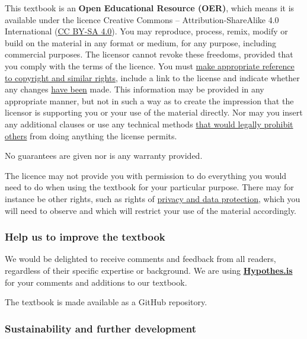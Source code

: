 \documentclass{article}
\begin{document}
This textbook is an \textbf{Open Educational Resource (OER)}, which means it is available under the licence Creative Commons – Attribution-ShareAlike 4.0 International (\href{https://creativecommons.org/licenses/by-sa/4.0/legalcode}{CC BY-SA 4.0}). You may reproduce, process, remix, modify or build on the material in any format or medium, for any purpose, including commercial purposes. The licensor cannot revoke these freedoms, provided that you comply with the terms of the licence. You must \href{https://creativecommons.org/licenses/by-sa/4.0/legalcode}{make appropriate reference to copyright and similar rights}, include a link to the license and indicate whether any changes \href{https://creativecommons.org/licenses/by-sa/4.0/legalcode}{have been} made. This information may be provided in any appropriate manner, but not in such a way as to create the impression that the licensor is supporting you or your use of the material directly. Nor may you insert any additional clauses or use any technical methods \href{https://creativecommons.org/licenses/by-sa/4.0/legalcode}{that would legally prohibit others} from doing anything the license permits.


No guarantees are given nor is any warranty provided.


The licence may not provide you with permission to do everything you would need to do when using the textbook for your particular purpose. There may for instance be other rights, such as rights of \href{https://creativecommons.org/licenses/by-sa/4.0/legalcode}{privacy and data protection}, which you will need to observe and which will restrict your use of the material accordingly.


\subsubsection{Help us to improve the textbook}\label{H7096628}



We would be delighted to receive comments and feedback from all readers, regardless of their specific expertise or background. We are using \textbf{\href{https://hypothes.is/}{Hypothes.is}} for your comments and additions to our textbook.


The textbook is made available as a GitHub repository.


\subsubsection{Sustainability and further development}\label{H2766812}
\end{document}
